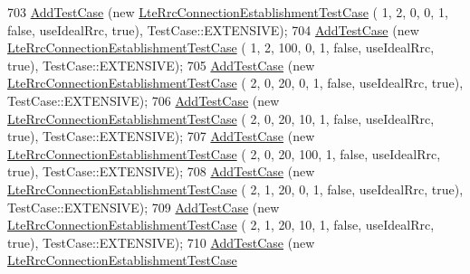 \begin{DoxyCode}
703       \hyperlink{classns3_1_1TestCase_a3718088e3eefd5d6454569d2e0ddd835}{AddTestCase} (\textcolor{keyword}{new} \hyperlink{classLteRrcConnectionEstablishmentTestCase}{LteRrcConnectionEstablishmentTestCase}
       (  1,     2,      0,           0,           1, \textcolor{keyword}{false}, useIdealRrc, \textcolor{keyword}{true}), TestCase::EXTENSIVE);
704       \hyperlink{classns3_1_1TestCase_a3718088e3eefd5d6454569d2e0ddd835}{AddTestCase} (\textcolor{keyword}{new} \hyperlink{classLteRrcConnectionEstablishmentTestCase}{LteRrcConnectionEstablishmentTestCase}
       (  1,     2,    100,           0,           1, \textcolor{keyword}{false}, useIdealRrc, \textcolor{keyword}{true}), TestCase::EXTENSIVE);
705       \hyperlink{classns3_1_1TestCase_a3718088e3eefd5d6454569d2e0ddd835}{AddTestCase} (\textcolor{keyword}{new} \hyperlink{classLteRrcConnectionEstablishmentTestCase}{LteRrcConnectionEstablishmentTestCase}
       (  2,     0,     20,           0,           1, \textcolor{keyword}{false}, useIdealRrc, \textcolor{keyword}{true}), TestCase::EXTENSIVE);
706       \hyperlink{classns3_1_1TestCase_a3718088e3eefd5d6454569d2e0ddd835}{AddTestCase} (\textcolor{keyword}{new} \hyperlink{classLteRrcConnectionEstablishmentTestCase}{LteRrcConnectionEstablishmentTestCase}
       (  2,     0,     20,          10,           1, \textcolor{keyword}{false}, useIdealRrc, \textcolor{keyword}{true}), TestCase::EXTENSIVE);
707       \hyperlink{classns3_1_1TestCase_a3718088e3eefd5d6454569d2e0ddd835}{AddTestCase} (\textcolor{keyword}{new} \hyperlink{classLteRrcConnectionEstablishmentTestCase}{LteRrcConnectionEstablishmentTestCase}
       (  2,     0,     20,         100,           1, \textcolor{keyword}{false}, useIdealRrc, \textcolor{keyword}{true}), TestCase::EXTENSIVE);
708       \hyperlink{classns3_1_1TestCase_a3718088e3eefd5d6454569d2e0ddd835}{AddTestCase} (\textcolor{keyword}{new} \hyperlink{classLteRrcConnectionEstablishmentTestCase}{LteRrcConnectionEstablishmentTestCase}
       (  2,     1,     20,           0,           1, \textcolor{keyword}{false}, useIdealRrc, \textcolor{keyword}{true}), TestCase::EXTENSIVE);
709       \hyperlink{classns3_1_1TestCase_a3718088e3eefd5d6454569d2e0ddd835}{AddTestCase} (\textcolor{keyword}{new} \hyperlink{classLteRrcConnectionEstablishmentTestCase}{LteRrcConnectionEstablishmentTestCase}
       (  2,     1,     20,          10,           1, \textcolor{keyword}{false}, useIdealRrc, \textcolor{keyword}{true}), TestCase::EXTENSIVE);
710       \hyperlink{classns3_1_1TestCase_a3718088e3eefd5d6454569d2e0ddd835}{AddTestCase} (\textcolor{keyword}{new} \hyperlink{classLteRrcConnectionEstablishmentTestCase}{LteRrcConnectionEstablishmentTestCase}

\end{DoxyCode}
